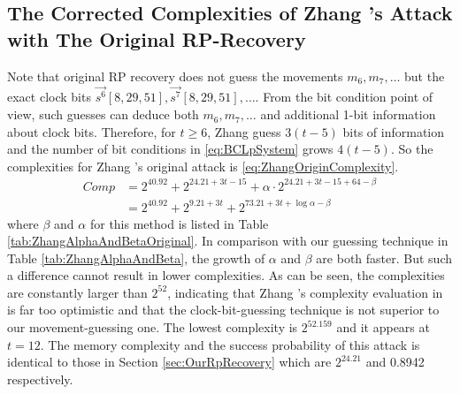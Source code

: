 \subsection{The Corrected Complexities of Zhang \etal's Attack with The Original RP-Recovery}\label{sec:ZhangRpRecovery}
Note that original RP recovery does not guess the movements $m_6,m_7,\ldots$ but the exact clock bits $\vec{s^6}[8,29,51], \vec{s^7}[8,29,51],\ldots$.
From the bit condition point of view, such guesses can deduce both $m_6,m_7,\ldots$ and additional 1-bit information about clock bits.
Therefore, for $t\geq 6$, Zhang \etal guess $3(t-5)$ bits of information and the number of bit conditions in \eqref{eq:BCLpSystem} grows $4(t-5)$.
So the complexities for Zhang \etal's original attack is \eqref{eq:ZhangOriginComplexity}.
\begin{equation}\label{eq:ZhangOriginComplexity}
\begin{aligned}
Comp&=2^{40.92}+2^{24.21+3t-15}+\alpha \cdot 2^{24.21+3t-15+64-\beta}\\
&=2^{40.92}+2^{9.21+3t}+2^{73.21+3t+\log \alpha -\beta}
\end{aligned}
\end{equation}
where $\beta$ and $\alpha$ for this method is listed in Table \ref{tab:ZhangAlphaAndBetaOriginal}.
In comparison with our guessing technique in Table \ref{tab:ZhangAlphaAndBeta}, the growth of $\alpha$ and $\beta$ are both faster.
But such a difference cannot result in lower complexities.
As can be seen, the complexities are constantly larger than $2^{52}$, indicating that Zhang \etal's complexity evaluation in \cite{AC:Zhang19} is far too optimistic and that the clock-bit-guessing technique is not superior to our movement-guessing one.
The lowest complexity is $2^{52.159}$ and it appears at $t=12$.
The memory complexity and the success probability of this attack is identical to those in  Section \ref{sec:OurRpRecovery} which are $2^{24.21}$ and 0.8942 respectively.

